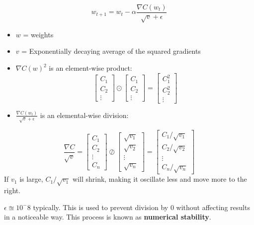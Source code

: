 \[w_{t+1} = w_t - \alpha \frac{\nabla C(w_t)}{\sqrt{v}+\epsilon}\]
\begin{itemize}
    \item $w$ = weights
    \item $v$ = Exponentially decaying average of the squared gradients
    \item $\nabla C (w)^2$ is an element-wise product:
     \[
            \begin{bmatrix}
            C_1 \\
            C_2 \\
            \vdots
        \end{bmatrix} \odot 
        \begin{bmatrix}
            C_1 \\
            C_2 \\
            \vdots
        \end{bmatrix} =
        \begin{bmatrix}
            C_1^2 \\
            C_2^2 \\
            \vdots
        \end{bmatrix}
    \]
    \item $\frac{\nabla C(w_t)}{\sqrt{v}+\epsilon}$ is an elemental-wise division:
\end{itemize}
\[
\frac{\nabla C}{\sqrt{v}} = 
\begin{bmatrix}
    C_1 \\
    C_2 \\
    \vdots \\
    C_n
\end{bmatrix}
\oslash
\begin{bmatrix}
    \sqrt{v_1} \\
    \sqrt{v_2} \\
    \vdots \\
    \sqrt{v_n}
\end{bmatrix}
=
\begin{bmatrix}
    C_1/\sqrt{v_1} \\
    C_2/\sqrt{v_2} \\
    \vdots \\
    C_n/\sqrt{v_n}
\end{bmatrix}
\]
If $v_1$ is large, $C_1/\sqrt{v_1}$ will shrink, making it oscillate less and move more to the right.

$\epsilon \approxeq 10^-8$ typically. This is used to prevent division by $0$ without affecting results in a noticeable way. This process is known as \textbf{numerical stability}.

